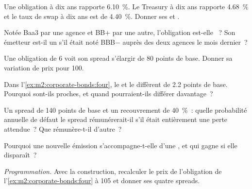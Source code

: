 \begin{exercise}[$\star$]\label{exo:m2:corporate-bonds:1}
Une obligation à dix ans rapporte 6.10~\%. Le Treasury à dix ans rapporte 4.68~\% et le
taux de swap à dix ans est de 4.40~\%. Donner ses  et .
\end{exercise}

\begin{exercise}[$\star$]\label{exo:m2:corporate-bonds:2}
Notée Baa3 par une agence et BB$+$ par une autre, l'obligation est-elle ~?
Son émetteur est-il un  s'il était noté BBB$-$ auprès des deux agences le mois dernier~?
\end{exercise}

\begin{exercise}[$\star$]\label{exo:m2:corporate-bonds:3}
Une obligation de  6 voit son spread s'élargir de 80 points de base. Donner sa
variation de prix pour 100.
\end{exercise}

\begin{exercise}[$\star\star$]\label{exo:m2:corporate-bonds:4}
Dans l'\cref{ex:m2:corporate-bonds:four}, le  et le  diffèrent
de 2.2 points de base. Pourquoi sont-ils proches, et quand pourraient-ils différer davantage~?
\end{exercise}

\begin{exercise}[$\star\star$]\label{exo:m2:corporate-bonds:5}
Un spread de 140 points de base et un recouvrement de 40~\%~: quelle probabilité annuelle de défaut
le spread rémunérerait-il s'il était entièrement une perte attendue~? Que rémunère-t-il
d'autre~?
\end{exercise}

\begin{exercise}[$\star\star$]\label{exo:m2:corporate-bonds:6}
Pourquoi une nouvelle émission s'accompagne-t-elle d'une , et qui gagne si elle disparaît~?
\end{exercise}

\begin{exercise}[$\star\star\star$]\label{exo:m2:corporate-bonds:7}
\emph{Programmation.} Avec la construction, recalculer le prix de l'obligation de l'\cref{ex:m2:corporate-bonds:four}
à 105 et donner ses quatre spreads.
\end{exercise}

